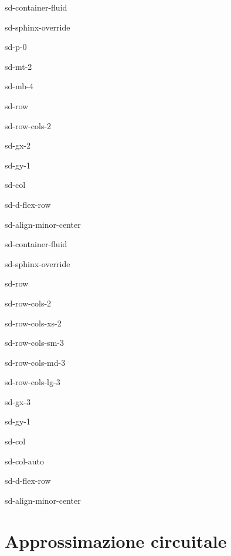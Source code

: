 \documentclass[letterpaper,10pt,italian]{jupyterBook}
\begin{document}
\begin{sphinxuseclass}{sd-container-fluid}
\begin{sphinxuseclass}{sd-sphinx-override}
\begin{sphinxuseclass}{sd-p-0}
\begin{sphinxuseclass}{sd-mt-2}
\begin{sphinxuseclass}{sd-mb-4}
\begin{sphinxuseclass}{sd-row}
\begin{sphinxuseclass}{sd-row-cols-2}
\begin{sphinxuseclass}{sd-gx-2}
\begin{sphinxuseclass}{sd-gy-1}
\begin{sphinxuseclass}{sd-col}
\begin{sphinxuseclass}{sd-d-flex-row}
\begin{sphinxuseclass}{sd-align-minor-center}
\begin{sphinxuseclass}{sd-container-fluid}
\begin{sphinxuseclass}{sd-sphinx-override}
\begin{sphinxuseclass}{sd-row}
\begin{sphinxuseclass}{sd-row-cols-2}
\begin{sphinxuseclass}{sd-row-cols-xs-2}
\begin{sphinxuseclass}{sd-row-cols-sm-3}
\begin{sphinxuseclass}{sd-row-cols-md-3}
\begin{sphinxuseclass}{sd-row-cols-lg-3}
\begin{sphinxuseclass}{sd-gx-3}
\begin{sphinxuseclass}{sd-gy-1}
\begin{sphinxuseclass}{sd-col}
\begin{sphinxuseclass}{sd-col-auto}
\begin{sphinxuseclass}{sd-d-flex-row}
\begin{sphinxuseclass}{sd-align-minor-center}
\end{sphinxuseclass}
\end{sphinxuseclass}
\end{sphinxuseclass}
\end{sphinxuseclass}
\end{sphinxuseclass}
\end{sphinxuseclass}
\end{sphinxuseclass}
\end{sphinxuseclass}
\end{sphinxuseclass}
\end{sphinxuseclass}
\end{sphinxuseclass}
\end{sphinxuseclass}
\end{sphinxuseclass}
\end{sphinxuseclass}
\end{sphinxuseclass}
\end{sphinxuseclass}
\end{sphinxuseclass}
\end{sphinxuseclass}
\end{sphinxuseclass}
\end{sphinxuseclass}
\end{sphinxuseclass}
\end{sphinxuseclass}
\end{sphinxuseclass}
\end{sphinxuseclass}
\end{sphinxuseclass}
\end{sphinxuseclass}

\chapter{Approssimazione circuitale}
\label{\detokenize{ch/circuits:approssimazione-circuitale}}\label{\detokenize{ch/circuits:classical-electromagnetism-circuits}}\label{\detokenize{ch/circuits::doc}}
\sphinxAtStartPar
{} 
\end{document}
